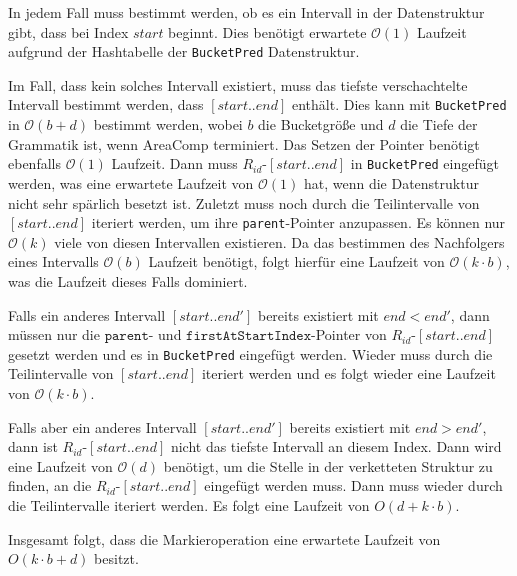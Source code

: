 In jedem Fall muss bestimmt werden, ob es ein Intervall in der Datenstruktur gibt, dass bei Index $start$ beginnt. Dies benötigt erwartete $\mathcal{O}(1)$ Laufzeit aufgrund der Hashtabelle der \texttt{BucketPred} Datenstruktur. 

Im Fall, dass kein solches Intervall existiert, muss das tiefste verschachtelte Intervall bestimmt werden, dass $[start..end]$ enthält. Dies kann mit \texttt{BucketPred} in $\mathcal{O}(b + d)$ bestimmt werden, wobei $b$ die Bucketgröße und $d$ die Tiefe der Grammatik ist, wenn AreaComp terminiert. Das Setzen der Pointer benötigt ebenfalls $\mathcal{O}(1)$ Laufzeit. 
Dann muss $R_{id}$-$[start..end]$ in \texttt{BucketPred} eingefügt werden, was eine erwartete Laufzeit von $\mathcal{O}(1)$ hat, wenn die Datenstruktur nicht sehr spärlich besetzt ist. Zuletzt muss noch durch die Teilintervalle von $[start..end]$ iteriert werden, um ihre \texttt{parent}-Pointer anzupassen. Es können nur $\mathcal{O}(k)$ viele von diesen Intervallen existieren. Da das bestimmen des Nachfolgers eines Intervalls $\mathcal{O}(b)$ Laufzeit benötigt, folgt hierfür eine Laufzeit von $\mathcal{O}(k \cdot b)$, was die Laufzeit dieses Falls dominiert.

Falls ein anderes Intervall $[start..end']$ bereits existiert mit $end < end'$, dann müssen nur die $\texttt{parent}$- und $\texttt{firstAtStartIndex}$-Pointer von $R_{id}$-$[start..end]$ gesetzt werden und es in \texttt{BucketPred} eingefügt werden. Wieder muss durch die Teilintervalle von $[start..end]$ iteriert werden und es folgt wieder eine Laufzeit von $\mathcal{O}(k \cdot b)$.

Falls aber ein anderes Intervall $[start..end']$ bereits existiert mit $end > end'$, dann ist $R_{id}$-$[start..end]$ nicht das tiefste Intervall an diesem Index. Dann wird eine Laufzeit von $\mathcal{O}(d)$ benötigt, um die Stelle in der verketteten Struktur zu finden, an die $R_{id}$-$[start..end]$ eingefügt werden muss. Dann muss wieder durch die Teilintervalle iteriert werden.
Es folgt eine Laufzeit von ${O}(d + k \cdot b)$.

Insgesamt folgt, dass die Markieroperation eine erwartete Laufzeit von ${O}(k \cdot b + d)$ besitzt.